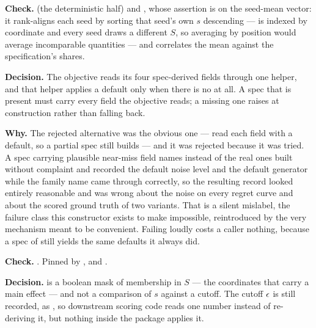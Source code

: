 \begin{sloppypar}
\textbf{Check.}
(the deterministic half) and
,
whose assertion is on the seed-mean vector: it rank-aligns each seed by
sorting that seed's own $s$
descending ---  is indexed by coordinate and every seed draws
a different $S$, so averaging by position would average incomparable quantities
--- and correlates the mean against the specification's shares.
\end{sloppypar}

\label{app:so:a4:r27}

\textbf{Decision.} The objective reads its four spec-derived fields through one
helper, and that helper applies a default only when there is no
 at all. A spec that is present must
carry every field the objective reads; a missing one raises
 at construction rather than falling back.

\textbf{Why.} The rejected alternative was the obvious one --- read each field
with a default, so a partial spec still builds --- and it was rejected because
it was tried. A spec carrying plausible near-miss field names instead of the
real ones built without complaint and recorded the default noise level and the
default generator while the family name came through correctly, so the
resulting record looked entirely reasonable and was wrong about the noise on
every regret curve and about the scored ground truth of two variants. That is a
silent mislabel, the failure class this constructor exists to make impossible,
reintroduced by the very mechanism meant to be convenient. Failing loudly costs
a caller nothing, because a spec of  still yields the same
defaults it always did.

\begin{sloppypar}
\textbf{Check.} . Pinned by
,
 and
.
\end{sloppypar}

\label{app:so:a4:r29}

\textbf{Decision.}  is a boolean mask of membership in
$S$ --- the coordinates that carry a main effect --- and not a comparison of
$s$ against a cutoff. The cutoff $\epsilon$ is still recorded, as
, so downstream scoring code reads one number
instead of re-deriving it, but nothing inside the package applies it.

